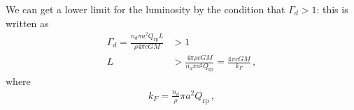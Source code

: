 \documentclass[main.tex]{subfiles}
\begin{document}
We can get a lower limit for the luminosity by the condition that \(\Gamma_{d}>1\): this is written as 
%
\begin{align}
\Gamma_{d} = \frac{n_d \pi a^2 Q _{\text{rp}} L}{\rho 4 \pi c GM}
&>1  \\
L &> \frac{4 \pi \rho c GM}{n_d \pi a^2 Q _{\text{rp}}} = \frac{4 \pi c GM}{k_F}
\,,
\end{align}
%
where 
%
\begin{align}
k_F = \frac{n_d}{\rho } \pi a^2 Q _{\text{rp}}
\,,
\end{align}
\end{document}
